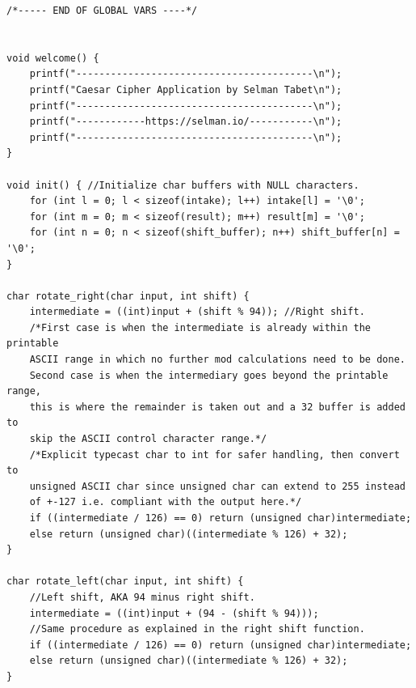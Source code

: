 \documentclass{article}
\begin{document}
\begin{verbatim}
/*----- END OF GLOBAL VARS ----*/


void welcome() {
    printf("-----------------------------------------\n");
    printf("Caesar Cipher Application by Selman Tabet\n");
    printf("-----------------------------------------\n");
    printf("------------https://selman.io/-----------\n");
    printf("-----------------------------------------\n");
}

void init() { //Initialize char buffers with NULL characters.
    for (int l = 0; l < sizeof(intake); l++) intake[l] = '\0'; 
    for (int m = 0; m < sizeof(result); m++) result[m] = '\0';
    for (int n = 0; n < sizeof(shift_buffer); n++) shift_buffer[n] = '\0';
}

char rotate_right(char input, int shift) {
    intermediate = ((int)input + (shift % 94)); //Right shift.
    /*First case is when the intermediate is already within the printable
    ASCII range in which no further mod calculations need to be done.
    Second case is when the intermediary goes beyond the printable range,
    this is where the remainder is taken out and a 32 buffer is added to 
    skip the ASCII control character range.*/
    /*Explicit typecast char to int for safer handling, then convert to
    unsigned ASCII char since unsigned char can extend to 255 instead
    of +-127 i.e. compliant with the output here.*/
    if ((intermediate / 126) == 0) return (unsigned char)intermediate;
    else return (unsigned char)((intermediate % 126) + 32);
}

char rotate_left(char input, int shift) {
    //Left shift, AKA 94 minus right shift.
    intermediate = ((int)input + (94 - (shift % 94)));
    //Same procedure as explained in the right shift function.
    if ((intermediate / 126) == 0) return (unsigned char)intermediate;
    else return (unsigned char)((intermediate % 126) + 32);
}




\end{verbatim}
\end{document}
